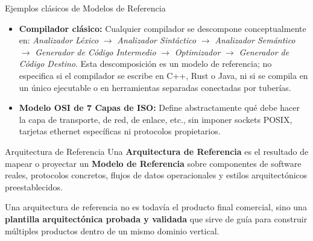 \begin{ejemplo}{Ejemplos clásicos de Modelos de Referencia}
\begin{itemize}[leftmargin=1.5em]
  \item \textbf{Compilador clásico:} Cualquier compilador se descompone conceptualmente en: \emph{Analizador Léxico} $\to$ \emph{Analizador Sintáctico} $\to$ \emph{Analizador Semántico} $\to$ \emph{Generador de Código Intermedio} $\to$ \emph{Optimizador} $\to$ \emph{Generador de Código Destino}. Esta descomposición es un modelo de referencia; no especifica si el compilador se escribe en C++, Rust o Java, ni si se compila en un único ejecutable o en herramientas separadas conectadas por tuberías.
  \item \textbf{Modelo OSI de 7 Capas de ISO:} Define abstractamente qué debe hacer la capa de transporte, de red, de enlace, etc., sin imponer sockets POSIX, tarjetas ethernet específicas ni protocolos propietarios.
\end{itemize}
\end{ejemplo}

\begin{definicion}{Arquitectura de Referencia}
Una \textbf{Arquitectura de Referencia} es el resultado de mapear o proyectar un \textbf{Modelo de Referencia} sobre componentes de software reales, protocolos concretos, flujos de datos operacionales y estilos arquitectónicos preestablecidos.
\end{definicion}

Una arquitectura de referencia no es todavía el producto final comercial, sino una \textbf{plantilla arquitectónica probada y validada} que sirve de guía para construir múltiples productos dentro de un mismo dominio vertical.


